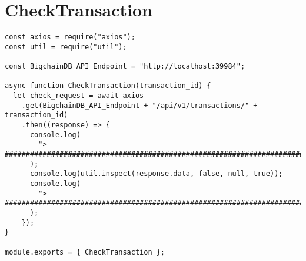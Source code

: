 \section{CheckTransaction}
\begin{verbatim}
const axios = require("axios");
const util = require("util");

const BigchainDB_API_Endpoint = "http://localhost:39984";

async function CheckTransaction(transaction_id) {
  let check_request = await axios
    .get(BigchainDB_API_Endpoint + "/api/v1/transactions/" + transaction_id)
    .then((response) => {
      console.log(
        "> ##########################################################################################################"
      );
      console.log(util.inspect(response.data, false, null, true));
      console.log(
        "> ##########################################################################################################"
      );
    });
}

module.exports = { CheckTransaction };
\end{verbatim}